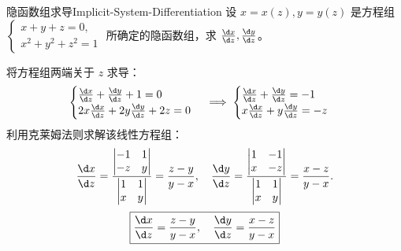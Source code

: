 \begin{problem}{隐函数组求导}{Implicit-System-Differentiation}
    设 $x = x(z), y = y(z)$ 是方程组 $\begin{cases} x + y + z = 0, \\ x^2 + y^2 + z^2 = 1 \end{cases}$ 所确定的隐函数组，求 $\frac{\d x}{\d z}, \frac{\d y}{\d z}$。
\end{problem}

\begin{solution}
    将方程组两端关于 $z$ 求导：
    \begin{equation}
        \begin{cases}
            \frac{\d x}{\d z} + \frac{\d y}{\d z} + 1 = 0 \\
            2x \frac{\d x}{\d z} + 2y \frac{\d y}{\d z} + 2z = 0
        \end{cases} \implies
        \begin{cases}
            \frac{\d x}{\d z} + \frac{\d y}{\d z} = -1 \\
            x \frac{\d x}{\d z} + y \frac{\d y}{\d z} = -z
        \end{cases}
    \end{equation}
    利用克莱姆法则求解该线性方程组：
    \begin{equation}
        \frac{\d x}{\d z} = \frac{\begin{vmatrix} -1 & 1 \\ -z & y \end{vmatrix}}{\begin{vmatrix} 1 & 1 \\ x & y \end{vmatrix}} = \frac{z - y}{y - x}, \quad \frac{\d y}{\d z} = \frac{\begin{vmatrix} 1 & -1 \\ x & -z \end{vmatrix}}{\begin{vmatrix} 1 & 1 \\ x & y \end{vmatrix}} = \frac{x - z}{y - x}.
    \end{equation}
    \begin{equation}
        \boxed{\frac{\d x}{\d z} = \frac{z - y}{y - x}, \quad \frac{\d y}{\d z} = \frac{x - z}{y - x}}
    \end{equation}
\end{solution}


